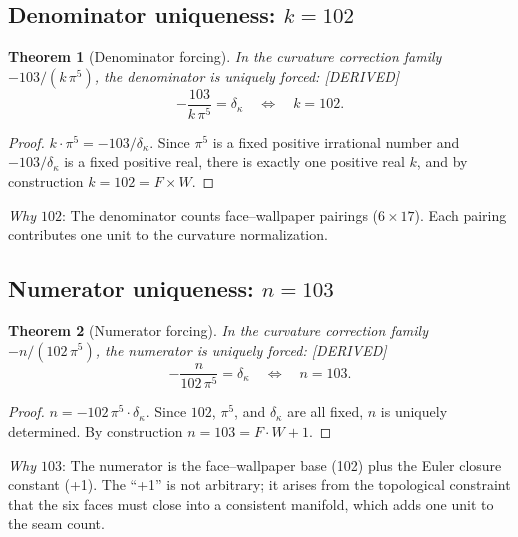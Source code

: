 \documentclass[11pt,a4paper]{article}
\newtheorem{theorem}{Theorem}[section]
\theoremstyle{definition}
\theoremstyle{remark}
\newcommand{\dkappa}{\delta_\kappa}
\newcommand{\DERIVED}{\textcolor{blue!70!black}{\footnotesize\textsf{[DERIVED]}}}
\begin{document}
\subsection{Denominator uniqueness: $k = 102$}

\begin{theorem}[Denominator forcing]
\label{thm:k_eq_102}
In the curvature correction family $-103/(k\,\pi^5)$, the denominator is
uniquely forced: \DERIVED{}
\begin{equation}
  -\frac{103}{k\,\pi^5} = \dkappa
  \quad\Longleftrightarrow\quad k = 102.
  \label{eq:k_forced}
\end{equation}
\end{theorem}

\begin{proof}
$k \cdot \pi^5 = -103/\dkappa$.  Since $\pi^5$ is a fixed positive
irrational number and $-103/\dkappa$ is a fixed positive real, there is
exactly one positive real $k$, and by construction $k = 102 = F \times W$.
\end{proof}

\noindent
\textit{Why $102$}: The denominator counts face--wallpaper pairings
($6 \times 17$).  Each pairing contributes one unit to the curvature
normalization.

\subsection{Numerator uniqueness: $n = 103$}

\begin{theorem}[Numerator forcing]
\label{thm:n_eq_103}
In the curvature correction family $-n/(102\,\pi^5)$, the numerator is
uniquely forced: \DERIVED{}
\begin{equation}
  -\frac{n}{102\,\pi^5} = \dkappa
  \quad\Longleftrightarrow\quad n = 103.
  \label{eq:n_forced}
\end{equation}
\end{theorem}

\begin{proof}
$n = -102\,\pi^5 \cdot \dkappa$.  Since $102$, $\pi^5$, and $\dkappa$ are
all fixed, $n$ is uniquely determined.  By construction $n = 103 = F \cdot W + 1$.
\end{proof}

\noindent
\textit{Why $103$}: The numerator is the face--wallpaper base (102) plus the
Euler closure constant (+1).  The ``+1'' is not arbitrary; it arises from
the topological constraint that the six faces must close into a consistent
manifold, which adds one unit to the seam count.
\end{document}

